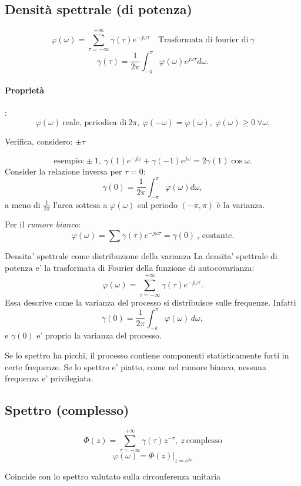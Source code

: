 \documentclass[11pt,a4paper]{article}
\begin{document}
\subsection{Densità spettrale (di potenza)}
\[
\varphi(\omega)=\sum_{\tau=-\infty}^{+\infty}\gamma(\tau)e^{-j\omega\tau} \quad \text{Trasformata di fourier di} \ \gamma
\]
\[
\gamma(\tau)=\frac{1}{2\pi}\int_{-\pi}^{\pi}\varphi(\omega)e^{j\omega\tau}d\omega.
\]
\paragraph{Proprietà}: 
\[
\varphi(\omega) \ \text{reale, periodica di} \ 2\pi, \ \varphi(-\omega)=\varphi(\omega), \ \varphi(\omega)\ge 0\ \forall\omega.
\]


Verifica, considero: $\pm\tau$

\[
\text{esempio:} \pm1, \ \gamma(1)e^{-j\omega}+\gamma(-1)e^{j\omega}=2\gamma(1)\cos\omega.
\]
 Consider la relazione inversa per $\tau=0$:
\[
\gamma(0)=\frac{1}{2\pi}\int_{-\pi}^{\pi}\varphi(\omega)d\omega,
\]
a meno di $\frac{1}{2\pi}$ l'area sottesa a $\varphi(\omega)$ sul periodo $(-\pi,\pi)$ è la varianza.

Per il \emph{rumore bianco}:
\[
\varphi(\omega)=\sum \gamma(\tau)e^{-j\omega\tau}=\gamma(0) \ \text{, costante.}
\]

\begin{spiegazione}{Densita' spettrale come distribuzione della varianza}
La densita' spettrale di potenza e' la trasformata di Fourier della funzione di autocovarianza:
\[
\varphi(\omega)=\sum_{\tau=-\infty}^{+\infty}\gamma(\tau)e^{-j\omega\tau}.
\]
Essa descrive come la varianza del processo si distribuisce sulle frequenze. Infatti
\[
\gamma(0)=\frac{1}{2\pi}\int_{-\pi}^{\pi}\varphi(\omega)\,d\omega,
\]
e $\gamma(0)$ e' proprio la varianza del processo.

Se lo spettro ha picchi, il processo contiene componenti statisticamente forti in certe frequenze. Se lo spettro e' piatto, come nel rumore bianco, nessuna frequenza e' privilegiata.
\end{spiegazione}


\subsection{Spettro (complesso)}
\[
\Phi(z)=\sum_{\tau=-\infty}^{+\infty}\gamma(\tau)z^{-\tau}, \  z \ \text{complesso}
\]
\[
\varphi(\omega)=\Phi(z)\big|_{z=e^{j\omega}}
\]
\begin{center}
    Coincide con lo spettro valutato sulla circonferenza unitaria
\end{center}
\end{document}
